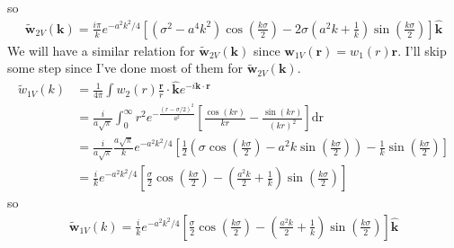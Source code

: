 \documentclass[letterpaper,twocolumn,amsmath,amssymb,prb]{revtex4-1}
\newcommand{\rr}{\textbf{r}}
\newcommand{\kk}{\textbf{k}}
\begin{document}
\begin{widetext}
so
\begin{align}
  \tilde{\mathbf{w}}_{2V}(\kk) = \frac{i \pi}{k}e^{-a^2k^2/4}\left[ \left(\sigma^2 -
       a^4k^2\right) \cos\left(\frac{k\sigma}{2}\right) -
     2\sigma \left(a^2k + \frac{1}{k}
     \right)\sin\left(\frac{k\sigma}{2}\right) \right] \mathbf{\hat{k}}
\end{align}
We will have a similar relation for $\tilde{\mathbf{w}}_{2V}(\kk)$
since $\mathbf{w}_{1V}(\rr) = w_1(r)\rr$.  I'll skip some step since
I've done most of them for $\tilde{\mathbf{w}}_{2V}(\kk)$.
\begin{align}
  \tilde{w}_{1V}(k) &= \frac{1}{4\pi}\int w_2(r)\frac{\rr}{r} \cdot \mathbf{\hat{k}} e^{-i\kk \cdot
  \rr} \\
  &= \frac{i}{a\sqrt{\pi}}\int_0^\infty r^2
  e^{-\frac{(r-\sigma/2)^2}{a^2}} \left[ \frac{\cos(kr)}{kr}
    - \frac{\sin(kr)}{(kr)^2}\right] \mathrm{dr} \\
  &= \frac{i}{a\sqrt{\pi}} \frac{a\sqrt{\pi}}{k}e^{-a^2k^2/4} \left[
    \frac{1}{2} \left( \sigma \cos\left(\frac{k\sigma}{2}\right) - a^2k
    \sin\left(\frac{k\sigma}{2}\right) \right) -\frac{1}{k}
    \sin\left(\frac{k\sigma}{2}\right) \right] \\
  &= \frac{i}{k} e^{-a^2k^2/4} \left[
    \frac{\sigma}{2} \cos\left(\frac{k\sigma}{2}\right) - \left( \frac{a^2k}{2}
    + \frac{1}{k} \right) \sin\left(\frac{k\sigma}{2}\right) \right]
\end{align}
so
\begin{align}
  \mathbf{\tilde{w}}_{1V}(k)= \frac{i}{k} e^{-a^2k^2/4} \left[
    \frac{\sigma}{2} \cos\left(\frac{k\sigma}{2}\right) - \left( \frac{a^2k}{2}
    + \frac{1}{k} \right) \sin\left(\frac{k\sigma}{2}\right) \right]
  \mathbf{\hat{k}}
\end{align}
\end{widetext}

\end{document}
